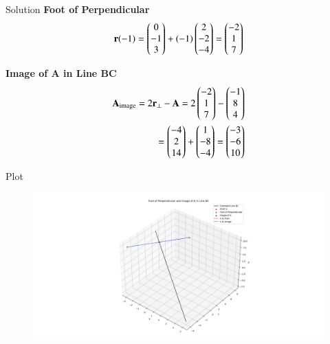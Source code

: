 \documentclass{beamer}
\begin{document}
\begin{frame}{Solution}
\textbf{Foot of Perpendicular}
\begin{align}
\mathbf{r}(-1) = 
\begin{pmatrix}0 \\ -1 \\ 3\end{pmatrix}
+ (-1)
\begin{pmatrix}2 \\ -2 \\ -4\end{pmatrix}
=
\begin{pmatrix}-2 \\ 1 \\ 7\end{pmatrix}
\end{align}

\textbf{Image of A in Line BC}
\begin{align}
\mathbf{A}_{\text{image}} = 2\mathbf{r}_{\perp} - \mathbf{A} =
2
\begin{pmatrix}-2 \\ 1 \\ 7\end{pmatrix}
-
\begin{pmatrix}-1 \\ 8 \\ 4\end{pmatrix}\\
=
\begin{pmatrix}-4 \\ 2 \\ 14\end{pmatrix}
+
\begin{pmatrix}1 \\ -8 \\ -4\end{pmatrix}
=
\begin{pmatrix}-3 \\ -6 \\ 10\end{pmatrix}
\end{align}
\end{frame}

\begin{frame}{Plot}
\begin{figure}[H]
    \centering
    \includegraphics[width=1\linewidth]{./figs/Figure_1.png}
    \caption{}
    \label{fig:fig1}
\end{figure}
\end{frame}
\end{document}

